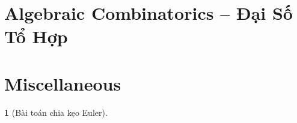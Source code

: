 \documentclass{article}
\newtheorem{baitoan}{}
\begin{document}

\section{Algebraic Combinatorics -- Đại Số Tổ Hợp}


\section{Miscellaneous}

\begin{baitoan}[Bài toán chia kẹo Euler]
	
\end{baitoan}


\printbibliography[heading=bibintoc]
	
\end{document}
